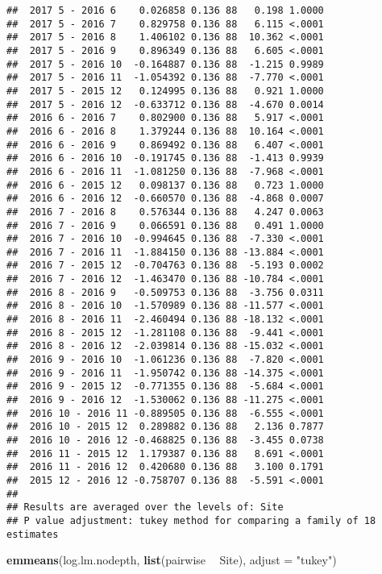 \documentclass[
]{article}
\newenvironment{Shaded}{\begin{snugshade}}{\end{snugshade}}
\newcommand{\DataTypeTok}[1]{\textcolor[rgb]{0.13,0.29,0.53}{#1}}
\newcommand{\KeywordTok}[1]{\textcolor[rgb]{0.13,0.29,0.53}{\textbf{#1}}}
\newcommand{\NormalTok}[1]{#1}
\newcommand{\OperatorTok}[1]{\textcolor[rgb]{0.81,0.36,0.00}{\textbf{#1}}}
\newcommand{\StringTok}[1]{\textcolor[rgb]{0.31,0.60,0.02}{#1}}
\begin{document}
\begin{verbatim}
##  2017 5 - 2016 6    0.026858 0.136 88   0.198 1.0000 
##  2017 5 - 2016 7    0.829758 0.136 88   6.115 <.0001 
##  2017 5 - 2016 8    1.406102 0.136 88  10.362 <.0001 
##  2017 5 - 2016 9    0.896349 0.136 88   6.605 <.0001 
##  2017 5 - 2016 10  -0.164887 0.136 88  -1.215 0.9989 
##  2017 5 - 2016 11  -1.054392 0.136 88  -7.770 <.0001 
##  2017 5 - 2015 12   0.124995 0.136 88   0.921 1.0000 
##  2017 5 - 2016 12  -0.633712 0.136 88  -4.670 0.0014 
##  2016 6 - 2016 7    0.802900 0.136 88   5.917 <.0001 
##  2016 6 - 2016 8    1.379244 0.136 88  10.164 <.0001 
##  2016 6 - 2016 9    0.869492 0.136 88   6.407 <.0001 
##  2016 6 - 2016 10  -0.191745 0.136 88  -1.413 0.9939 
##  2016 6 - 2016 11  -1.081250 0.136 88  -7.968 <.0001 
##  2016 6 - 2015 12   0.098137 0.136 88   0.723 1.0000 
##  2016 6 - 2016 12  -0.660570 0.136 88  -4.868 0.0007 
##  2016 7 - 2016 8    0.576344 0.136 88   4.247 0.0063 
##  2016 7 - 2016 9    0.066591 0.136 88   0.491 1.0000 
##  2016 7 - 2016 10  -0.994645 0.136 88  -7.330 <.0001 
##  2016 7 - 2016 11  -1.884150 0.136 88 -13.884 <.0001 
##  2016 7 - 2015 12  -0.704763 0.136 88  -5.193 0.0002 
##  2016 7 - 2016 12  -1.463470 0.136 88 -10.784 <.0001 
##  2016 8 - 2016 9   -0.509753 0.136 88  -3.756 0.0311 
##  2016 8 - 2016 10  -1.570989 0.136 88 -11.577 <.0001 
##  2016 8 - 2016 11  -2.460494 0.136 88 -18.132 <.0001 
##  2016 8 - 2015 12  -1.281108 0.136 88  -9.441 <.0001 
##  2016 8 - 2016 12  -2.039814 0.136 88 -15.032 <.0001 
##  2016 9 - 2016 10  -1.061236 0.136 88  -7.820 <.0001 
##  2016 9 - 2016 11  -1.950742 0.136 88 -14.375 <.0001 
##  2016 9 - 2015 12  -0.771355 0.136 88  -5.684 <.0001 
##  2016 9 - 2016 12  -1.530062 0.136 88 -11.275 <.0001 
##  2016 10 - 2016 11 -0.889505 0.136 88  -6.555 <.0001 
##  2016 10 - 2015 12  0.289882 0.136 88   2.136 0.7877 
##  2016 10 - 2016 12 -0.468825 0.136 88  -3.455 0.0738 
##  2016 11 - 2015 12  1.179387 0.136 88   8.691 <.0001 
##  2016 11 - 2016 12  0.420680 0.136 88   3.100 0.1791 
##  2015 12 - 2016 12 -0.758707 0.136 88  -5.591 <.0001 
## 
## Results are averaged over the levels of: Site 
## P value adjustment: tukey method for comparing a family of 18 estimates
\end{verbatim}

\begin{Shaded}
\begin{Highlighting}[]
\KeywordTok{emmeans}\NormalTok{(log.lm.nodepth, }\KeywordTok{list}\NormalTok{(pairwise }\OperatorTok{~}\StringTok{ }\NormalTok{Site), }\DataTypeTok{adjust =} \StringTok{"tukey"}\NormalTok{)}
\end{Highlighting}
\end{Shaded}
\end{document}
